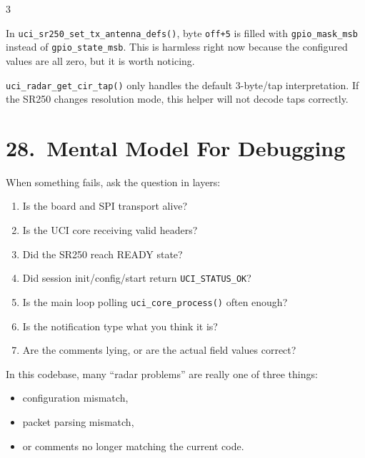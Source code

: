 \documentclass[10pt]{article}
\begin{document}
\begin{multicols*}{3}
\begin{tcolorbox}[warnbox={Caveat 4 --- Possible TX Antenna Struct Packing Typo}]
In \texttt{uci\_sr250\_set\_tx\_antenna\_defs()}, byte \texttt{off+5} is filled with \texttt{gpio\_mask\_msb} instead of \texttt{gpio\_state\_msb}. This is harmless right now because the configured values are all zero, but it is worth noticing.
\end{tcolorbox}

\begin{tcolorbox}[warnbox={Caveat 5 --- CIR Helper Assumes One Format}]
\texttt{uci\_radar\_get\_cir\_tap()} only handles the default 3-byte/tap interpretation. If the SR250 changes resolution mode, this helper will not decode taps correctly.
\end{tcolorbox}

\section*{28.\ Mental Model For Debugging}

When something fails, ask the question in layers:
\begin{enumerate}
  \item Is the board and SPI transport alive?
  \item Is the UCI core receiving valid headers?
  \item Did the SR250 reach READY state?
  \item Did session init/config/start return \texttt{UCI\_STATUS\_OK}?
  \item Is the main loop polling \texttt{uci\_core\_process()} often enough?
  \item Is the notification type what you think it is?
  \item Are the comments lying, or are the actual field values correct?
\end{enumerate}

\begin{tcolorbox}[summarybox={Best Debugging Principle}]
In this codebase, many ``radar problems'' are really one of three things:
\begin{itemize}
  \item configuration mismatch,
  \item packet parsing mismatch,
  \item or comments no longer matching the current code.
\end{itemize}
\end{tcolorbox}


\end{multicols*}
\end{document}
